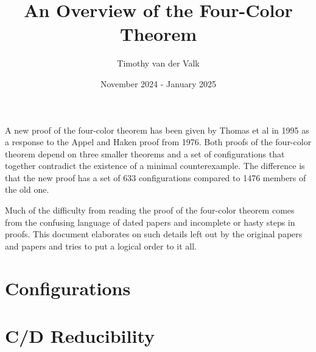 \documentclass{article}
\title{An Overview of the Four-Color Theorem}
\author{Timothy van der Valk}
\date{November 2024 - January 2025}
\begin{document}
\maketitle

A new proof of the four-color theorem has been given by Thomas et al \cite{thomas} in 1995 as a response to the Appel and Haken proof from 1976. Both proofs of the four-color theorem depend on three smaller theorems and a set of configurations that together contradict the existence of a minimal counterexample. The difference is that the new proof has a set of 633 configurations compared to 1476 members of the old one.

Much of the difficulty from reading the proof of the four-color theorem comes from the confusing language of dated papers and incomplete or hasty steps in proofs. This document elaborates on such details left out by the original papers and papers and tries to put a logical order to it all.


\tableofcontents

\pagebreak




\section{Configurations}
\label{sec:config}

\section{C/D Reducibility}
\label{sec:reduce}

\pagebreak
\printbibliography
\end{document}
